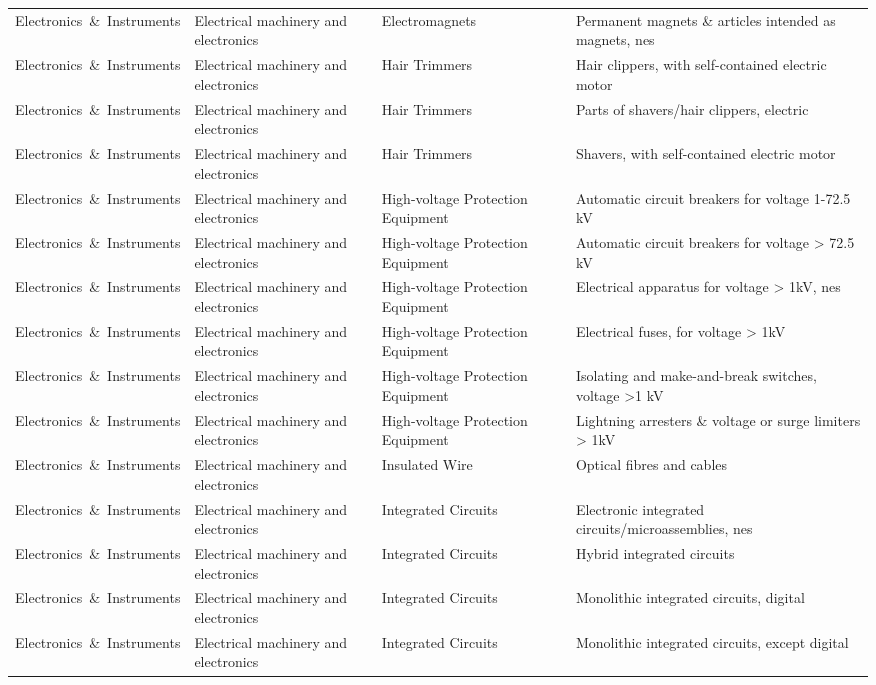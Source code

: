 \begin{appendices}
\begin{xltabular}{\textwidth}{|p{0.14\textwidth}|p{0.28\textwidth}|p{0.18\textwidth}|p{0.30\textwidth}|}
Electronics\ \&\ Instruments & Electrical machinery and electronics & Electromagnets & Permanent magnets \& articles intended as magnets, nes \\
Electronics\ \&\ Instruments & Electrical machinery and electronics & Hair Trimmers & Hair clippers, with self-contained electric motor \\
Electronics\ \&\ Instruments & Electrical machinery and electronics & Hair Trimmers & Parts of shavers/hair clippers, electric \\
Electronics\ \&\ Instruments & Electrical machinery and electronics & Hair Trimmers & Shavers, with self-contained electric motor \\
Electronics\ \&\ Instruments & Electrical machinery and electronics & High-voltage Protection Equipment & Automatic circuit breakers for voltage 1-72.5 kV \\
Electronics\ \&\ Instruments & Electrical machinery and electronics & High-voltage Protection Equipment & Automatic circuit breakers for voltage > 72.5 kV \\
Electronics\ \&\ Instruments & Electrical machinery and electronics & High-voltage Protection Equipment & Electrical apparatus for voltage > 1kV, nes \\
Electronics\ \&\ Instruments & Electrical machinery and electronics & High-voltage Protection Equipment & Electrical fuses, for voltage > 1kV \\
Electronics\ \&\ Instruments & Electrical machinery and electronics & High-voltage Protection Equipment & Isolating and make-and-break switches, voltage >1 kV \\
Electronics\ \&\ Instruments & Electrical machinery and electronics & High-voltage Protection Equipment & Lightning arresters \& voltage or surge limiters > 1kV \\
Electronics\ \&\ Instruments & Electrical machinery and electronics & Insulated Wire & Optical fibres and cables \\
Electronics\ \&\ Instruments & Electrical machinery and electronics & Integrated Circuits & Electronic integrated circuits/microassemblies, nes \\
Electronics\ \&\ Instruments & Electrical machinery and electronics & Integrated Circuits & Hybrid integrated circuits \\
Electronics\ \&\ Instruments & Electrical machinery and electronics & Integrated Circuits & Monolithic integrated circuits, digital \\
Electronics\ \&\ Instruments & Electrical machinery and electronics & Integrated Circuits & Monolithic integrated circuits, except digital \\

\end{xltabular}
\end{appendices}
